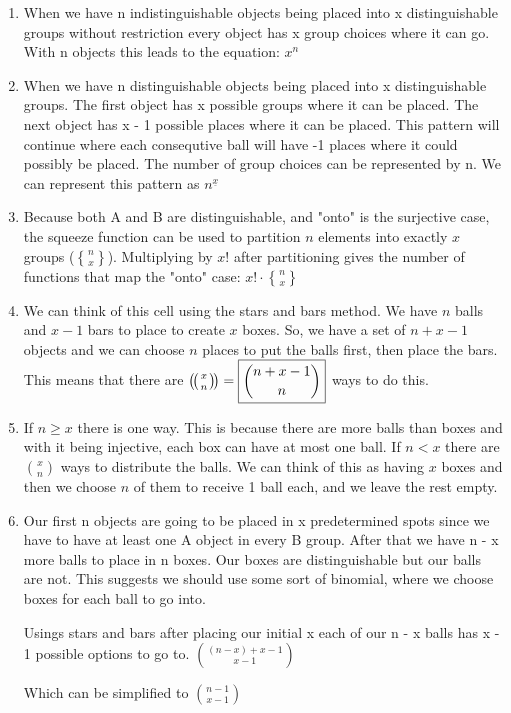 \documentclass[10pt, AMS Euler]{article}
\newcommand{\stirling}[2]{\genfrac{\{}{\}}{0pt}{}{#1}{#2}}
\newcommand{\multiset}[2]{\left(\!\left(\genfrac{}{}{0pt}{}{#1}{#2}\right)\!\right)}
\begin{document}
		\begin{enumerate}

			\item When we have n indistinguishable objects being placed into x distinguishable groups without restriction every object has x group choices where it can go. With n objects this leads to the equation: $\boxed{x^n}$
			\item When we have n distinguishable objects being placed into x distinguishable groups. The first object has x possible groups where it can be placed. The next object has x - 1 possible places where it can be placed. This pattern will continue where each consequtive ball will have -1 places where it could possibly be placed. The number of group choices can be represented by n. We can represent this pattern as $\boxed{n^{\underline{x}}}$
			\item Because both A and B are distinguishable, and "onto" is the surjective case, the squeeze function can be used to partition $n$ elements into exactly $x$ groups ($\stirling{n}{x}$). Multiplying by $x!$ after partitioning gives the number of functions that map the "onto" case: $\boxed{x! \cdot \stirling{n}{x}}$
			\item We can think of this cell using the stars and bars method. We have $n$ balls and $x-1$ bars to place to create $x$ boxes. So, we have a set of $n+x-1$ objects and we can choose $n$ places to put the balls first, then place the bars. This means that there are $\multiset{x}{n} = \boxed{\binom{n+x-1}{n}}$ ways to do this.
			\item If $n\geq x$ there is one way. This is because there are more balls than boxes and with it being injective, each box can have at most one ball. If $n<x$ there are $\boxed{\binom{x}{n}}$ ways to distribute the balls. We can think of this as having $x$ boxes and then we choose $n$ of them to receive 1 ball each, and we leave the rest empty.
			\item 
			Our first n objects are going to be placed in x predetermined spots since we have to have at least one A object in every B group. After that we have n - x more balls to place in n boxes. Our boxes are distinguishable but our balls are not. This suggests we should use some sort of binomial, where we choose boxes for each ball to go into. 

			Usings stars and bars after placing our initial x each of our n - x balls has x - 1 possible options to go to. 
			$\binom{(n-x)+x-1}{x-1}$
			
			Which can be simplified to $\boxed{\binom{n-1}{x-1}}$


\end{enumerate}
\end{document}
